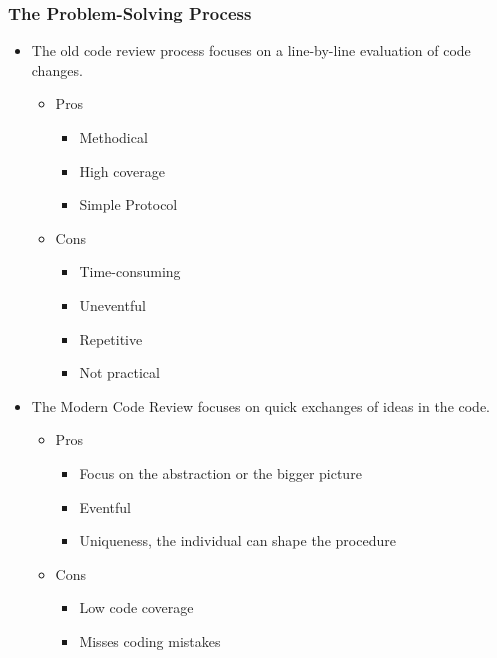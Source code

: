 \documentclass{article}
\begin{document}
\subsubsection{The Problem-Solving Process}
\begin{itemize}
    \item The old code review process focuses on a line-by-line evaluation of code changes. \cite{cassee_silent_2020}

    \begin{itemize}

        \item Pros
        \begin{itemize}
            \item Methodical
            \item High coverage
            \item Simple Protocol 
        \end{itemize}

        \item Cons
        \begin{itemize}
            \item Time-consuming
            \item Uneventful
            \item Repetitive
            \item Not practical 
        \end{itemize}
    \end{itemize}

    \item The Modern Code Review focuses on quick exchanges of ideas in the code. \cite{sadowski_modern_2018}
    \begin{itemize}
        \item Pros
        \begin{itemize}
            \item Focus on the abstraction or the bigger picture
            \item Eventful
            \item Uniqueness, the individual can shape the procedure
        \end{itemize}

        \item Cons
        \begin{itemize}
            \item Low code coverage 
            \item Misses coding mistakes
        \end{itemize}
    \end{itemize}   
\end{itemize}
\end{document}
